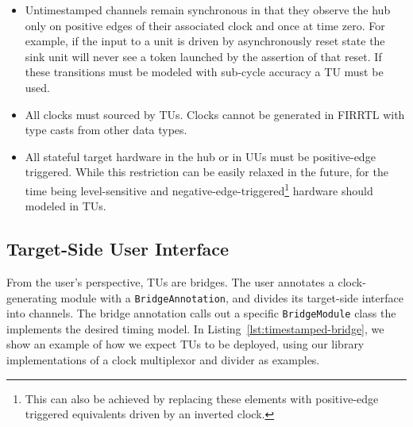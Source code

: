 \begin{itemize}

\item Untimestamped channels remain synchronous in that they observe the hub only on
    positive edges of their associated clock and once at time zero. For example,
    if the input to a unit is driven by asynchronously reset state the sink
    unit will never see a token launched by the assertion of that reset. If these transitions must be modeled
    with sub-cycle accuracy a TU must be used.

\item All clocks must sourced by TUs. Clocks cannot be generated in
    FIRRTL with type casts from other data types.

\item All stateful target hardware in the hub or in UUs must be
    positive-edge triggered. While this restriction can be easily relaxed in
    the future, for the time being level-sensitive and
    negative-edge-triggered\footnote{This can also be achieved by replacing
    these elements with positive-edge triggered equivalents driven by an inverted
    clock.} hardware should modeled in TUs.

\end{itemize}

\subsection{Target-Side User Interface}

From the user's perspective, TUs are bridges.
The user annotates a clock-generating module with a \texttt{BridgeAnnotation},
and divides its target-side interface into channels. The bridge annotation
calls out a specific \texttt{BridgeModule} class the implements the desired
timing model. In Listing~\ref{lst:timestamped-bridge}, we show an example of
how we expect TUs to be deployed, using our library implementations of a clock
multiplexor and divider as examples.

